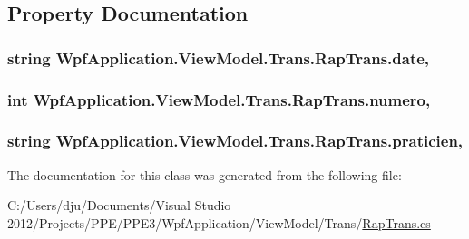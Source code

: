 \subsection{Property Documentation}
\hypertarget{class_wpf_application_1_1_view_model_1_1_trans_1_1_rap_trans_ad562e5cf54632e117c242e7a1904c842}{
\subsubsection[{date}]{\setlength{\rightskip}{0pt plus 5cm}string Wpf\-Application.\-View\-Model.\-Trans.\-Rap\-Trans.\-date\hspace{0.3cm}{\ttfamily [get]}, {\ttfamily [set]}}}\label{class_wpf_application_1_1_view_model_1_1_trans_1_1_rap_trans_ad562e5cf54632e117c242e7a1904c842}
\hypertarget{class_wpf_application_1_1_view_model_1_1_trans_1_1_rap_trans_a6f637f8b8031dc3b044e5d21a96a019d}{
\subsubsection[{numero}]{\setlength{\rightskip}{0pt plus 5cm}int Wpf\-Application.\-View\-Model.\-Trans.\-Rap\-Trans.\-numero\hspace{0.3cm}{\ttfamily [get]}, {\ttfamily [set]}}}\label{class_wpf_application_1_1_view_model_1_1_trans_1_1_rap_trans_a6f637f8b8031dc3b044e5d21a96a019d}
\hypertarget{class_wpf_application_1_1_view_model_1_1_trans_1_1_rap_trans_a288e17d16695cf138271c000d8aa652e}{
\subsubsection[{praticien}]{\setlength{\rightskip}{0pt plus 5cm}string Wpf\-Application.\-View\-Model.\-Trans.\-Rap\-Trans.\-praticien\hspace{0.3cm}{\ttfamily [get]}, {\ttfamily [set]}}}\label{class_wpf_application_1_1_view_model_1_1_trans_1_1_rap_trans_a288e17d16695cf138271c000d8aa652e}


The documentation for this class was generated from the following file\-:\begin{DoxyCompactItemize}
\item 
C\-:/\-Users/dju/\-Documents/\-Visual Studio 2012/\-Projects/\-P\-P\-E/\-P\-P\-E3/\-Wpf\-Application/\-View\-Model/\-Trans/\hyperlink{_rap_trans_8cs}{Rap\-Trans.\-cs}\end{DoxyCompactItemize}
